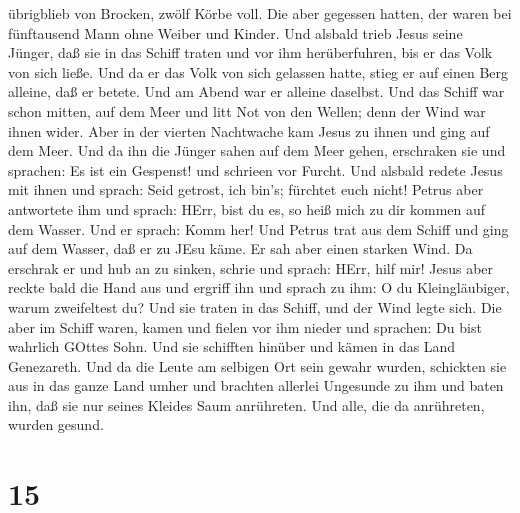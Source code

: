 übrigblieb von Brocken, zwölf Körbe voll.  Die aber
gegessen hatten, der waren bei fünftausend Mann ohne Weiber und Kinder.
 Und alsbald trieb Jesus seine Jünger, daß sie in das
Schiff traten und vor ihm herüberfuhren, bis er das Volk von sich ließe.
 Und da er das Volk von sich gelassen hatte, stieg er auf
einen Berg alleine, daß er betete. Und am Abend war er alleine daselbst.
 Und das Schiff war schon mitten, auf dem Meer und litt Not
von den Wellen; denn der Wind war ihnen wider.  Aber in der
vierten Nachtwache kam Jesus zu ihnen und ging auf dem Meer.
 Und da ihn die Jünger sahen auf dem Meer gehen, erschraken
sie und sprachen: Es ist ein Gespenst! und schrieen vor Furcht.
 Und alsbald redete Jesus mit ihnen und sprach: Seid
getrost, ich bin's; fürchtet euch nicht!  Petrus aber
antwortete ihm und sprach: HErr, bist du es, so heiß mich zu dir kommen
auf dem Wasser.  Und er sprach: Komm her! Und Petrus trat
aus dem Schiff und ging auf dem Wasser, daß er zu JEsu käme.
 Er sah aber einen starken Wind. Da erschrak er und hub an
zu sinken, schrie und sprach: HErr, hilf mir!  Jesus aber
reckte bald die Hand aus und ergriff ihn und sprach zu ihm: O du
Kleingläubiger, warum zweifeltest du?  Und sie traten in
das Schiff, und der Wind legte sich.  Die aber im Schiff
waren, kamen und fielen vor ihm nieder und sprachen: Du bist wahrlich
GOttes Sohn.  Und sie schifften hinüber und kämen in das
Land Genezareth.  Und da die Leute am selbigen Ort sein
gewahr wurden, schickten sie aus in das ganze Land umher und brachten
allerlei Ungesunde zu ihm  und baten ihn, daß sie nur
seines Kleides Saum anrühreten. Und alle, die da anrühreten, wurden
gesund.

\hypertarget{section-14}{%
\section{15}\label{section-14}}


